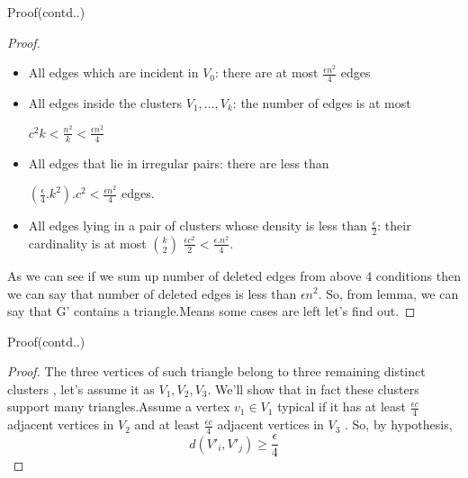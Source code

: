 \documentclass[10pt]{beamer}
\begin{document}
\begin{frame}{Proof(contd..)}
    \begin{proof}
        \begin{itemize}
            \item All edges which are incident in $V_{0}$: there are at most $\frac{\epsilon n^2}{4}$ edges
            \item All edges inside the clusters $V_{1},\dots , V_{k}$: the number of edges is at most
            \begin{center}
                $ c^2k < \frac{n^2}{k} < \frac{\epsilon n^2}{4}$
            \end{center}
            
            \item All edges that lie in irregular pairs: there are less than
            \begin{center}
                $(\frac{\epsilon}{4}.k^2).c^2 < \frac{\epsilon n^2}{4}$ edges.
            \end{center}

            \item All edges lying in a pair of clusters whose density is less than $\frac{\epsilon}{2}$: their cardinality
is at most $ k \choose 2$ $\frac{\epsilon c^2}{2} < \frac{\epsilon. n^2}{4}$.
        \end{itemize}
        As we can see if we sum up number of deleted edges from above 4 conditions then we can say that number of deleted edges is less than $\epsilon n^2$. So, from lemma, we can say that G' contains a triangle.Means some cases are left let's find out.
    \end{proof}
\end{frame}

\begin{frame}{Proof(contd..)}
\begin{proof}
The three vertices of such triangle belong to three remaining distinct clusters
, let's assume it as $V_{1}, V_{2}, V_{3}$. We’ll show that in fact these clusters support many triangles.Assume a vertex $v_{1} \in V_{1}$ typical if it has at least $\frac{\epsilon c}{4}$ adjacent vertices in $V_{2}$ and at
least $\frac{\epsilon c}{4}$  adjacent vertices in $V_{3}$ . So, by hypothesis,
\begin{equation} \label{eqn:bound}
    d(V'_{i},V'_{j}) \geq \frac{\epsilon}{4}
\end{equation}

\end{proof}
    
\end{frame}
\end{document}
